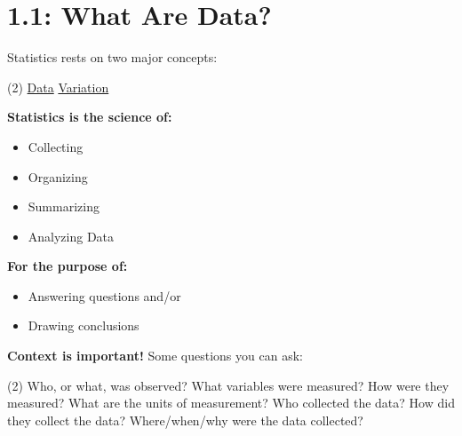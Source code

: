 \documentclass[../mathNotesPreamble]{subfiles}
\providecommand{\relscalefact}{1.4}
\begin{document}
\relscale{\relscalefact}
  \section{1.1: What Are Data?}
    Statistics rests on two major concepts:
    \begin{tasks}(2)
      \task \underline{Data}
      \task \underline{Variation}
    \end{tasks}

    \begin{minipage}[t]{0.5\linewidth}
      \textbf{Statistics is the science of:}
      \begin{itemize}
        \item Collecting
        \item Organizing
        \item Summarizing
        \item Analyzing Data
      \end{itemize}
    \end{minipage}%
    \begin{minipage}[t]{0.5\linewidth}
      \textbf{For the purpose of:}
      \begin{itemize}
        \item Answering questions and/or
        \item Drawing conclusions
      \end{itemize}
    \end{minipage}
    \vspace*{\baselineskip}

    \textbf{Context is important!} Some questions you can ask:
    \begin{tasks}[label=\textbullet](2)
      \task Who, or what, was observed?
      \task What variables were measured?
      \task How were they measured?
      \task What are the units of measurement?
      \task Who collected the data?
      \task How did they collect the data?
      \task* Where/when/why were the data collected?
    \end{tasks}
\end{document}
